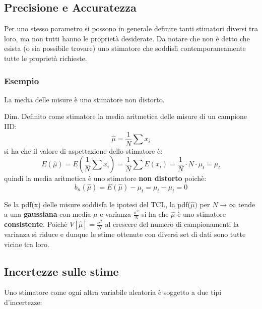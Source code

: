 \documentclass[11pt,a4paper]{book}
\begin{document}
\subsection{Precisione e Accuratezza}

 Per uno stesso parametro si possono in generale definire tanti stimatori diversi tra loro, ma non tutti hanno le propriet\`{a} desiderate. Da notare che non \`{e} detto che esista (o sia possibile trovare) uno stimatore che soddisfi contemporaneamente tutte le propriet\`{a} richieste.
\subsubsection{Esempio} 

La media delle misure \`{e} uno stimatore non distorto. \newline

Dim.
\newline
Definito come stimatore la media aritmetica delle misure di un campione IID:
\begin{equation*}
		 \hat{\mu} = \frac{1}{N}\sum{x_{i}} 
\end{equation*}
si ha che il valore di aspettazione dello stimatore \`{e}:
\begin{equation*}
	  E(\hat{\mu})= E(\frac{1}{N}\sum x_{i})= \frac{1}{N}\sum E(x_{i})= \frac{1}{N} \cdot N \cdot \mu_{t} = \mu_{t} 
\end{equation*}
quindi la media aritmetica \`{e} uno stimatore \textbf{non distorto} poich\`{e}:
\begin{equation*}
	 b_n(\hat{\mu}) = E(\hat{\mu}) - \mu_{t} = \mu_{t} - \mu_{t} = 0  
\end{equation*}

\noindent Se la pdf(x) delle misure soddisfa le ipotesi del TCL, la pdf($\hat{\mu})$ per $N \rightarrow \infty$ tende a una \textbf{gaussiana} con media $\mu$ e varianza $\frac{\sigma^2}{N}$ si ha che $\hat{\mu}$ \`{e} uno stimatore \textbf{consistente}. Poich\`{e} $V[\hat{\mu}] = \frac{\sigma^2}{N}$ al crescere del numero di campionamenti la varianza si riduce e dunque le stime ottenute con diversi set di dati sono tutte vicine tra loro.


\subsection{Incertezze sulle stime}

\noindent Uno stimatore come ogni altra variabile aleatoria \`{e} soggetto a due tipi d'incertezze:
\end{document}
